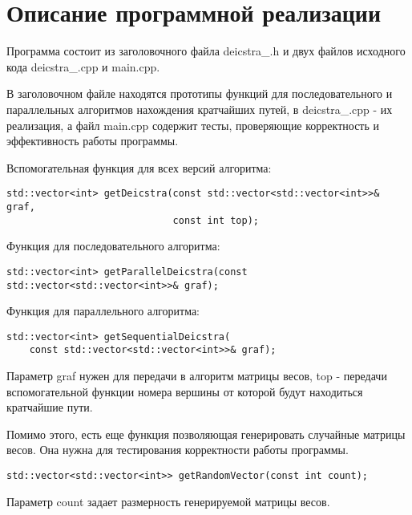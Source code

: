 \documentclass{report}
\begin{document}
\section*{Описание программной реализации}
Программа состоит из заголовочного файла deicstra\_<используемая технология>.h и двух файлов исходного кода deicstra\_<используемая технология>.cpp и main.cpp.
\par В заголовочном файле находятся прототипы функций для последовательного и параллельных алгоритмов нахождения кратчайших путей, в deicstra\_<используемая технология>.cpp - их реализация, а файл main.cpp содержит тесты, проверяющие корректность и эффективность работы программы.
\par Вспомогательная функция для всех версий алгоритма:
\begin{lstlisting}
std::vector<int> getDeicstra(const std::vector<std::vector<int>>& graf,
                             const int top);
\end{lstlisting}
\par Функция для последовательного алгоритма:
\begin{lstlisting}
std::vector<int> getParallelDeicstra(const std::vector<std::vector<int>>& graf);
\end{lstlisting}
\par Функция для параллельного алгоритма:
\begin{lstlisting}
std::vector<int> getSequentialDeicstra(
    const std::vector<std::vector<int>>& graf);
\end{lstlisting}
\par Параметр graf нужен для передачи в алгоритм матрицы весов, top - передачи вспомогательной функции номера вершины от которой будут находиться кратчайшие пути.
\par Помимо этого, есть еще функция позволяющая генерировать случайные матрицы весов. Она нужна для тестирования корректности работы программы.
\begin{lstlisting}
std::vector<std::vector<int>> getRandomVector(const int count);
\end{lstlisting}
\par Параметр count задает размерность генерируемой матрицы весов.
\newpage

\end{document}
